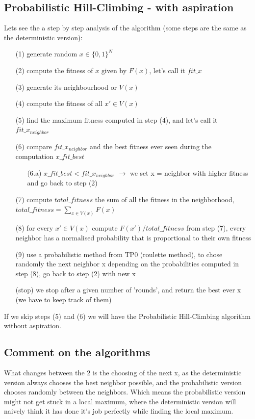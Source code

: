 \documentclass[a4paper]{article}
\begin{document}
\subsection{Probabilistic Hill-Climbing - with aspiration}
Lets see the a step by step analysis of the algorithm (some steps are the same as the deterministic version):
\begin{itemize}
\item[(1)] generate random $x \in \{0,1\}^{N}$
\item[(2)] compute the fitness of $x$ given by $F(x)$, let's call it $fit\_x$
\item[(3)] generate its neighbourhood or $V(x)$
\item[(4)] compute the fitness of all $x' \in V(x)$
\item[(5)] find the maximum fitness computed in step (4), and let's call it $fit\_x_{neighbor}$
\item[(6)] compare $fit\_x_{neighbor}$ and the best fitness ever seen during the computation $x\_fit\_best$
\begin{itemize}
\item[(6.a)] $x\_fit\_best < fit\_x_{neighbor}$ $\longrightarrow$ we set x = neighbor with higher fitness and go back to step (2)
\end{itemize}
\item[(7)] compute $total\_fitness$ the sum of all the fitness in the neighborhood, $total\_fitness = \sum_{x \in V(x)} F(x)$
\item[(8)] for every $x' \in V(x)$ compute $F(x')/total\_fitness$ from step (7), every neighbor has a normalised probability that is proportional to their own fitness
\item[(9)] use a probabilistic method from TP0 (roulette method), to chose randomly the next neighbor x depending on the probabilities computed in step (8), go back to step (2) with new x
\item[(stop)] we stop after a given number of 'rounds', and return the best ever x (we have to keep track of them) 
\end{itemize}
If we skip steps (5) and (6) we will have the Probabilistic Hill-Climbing algorithm without aspiration.
\subsection{Comment on the algorithms}
What changes between the 2 is the choosing of the next x, as the deterministic version always chooses the best neighbor possible, and the probabilistic version chooses randomly between the neighbors. Which means the probabilistic version might not get stuck in a local maximum, where the deterministic version will naively think it has done it's job perfectly while finding the local maximum.
\end{document}
